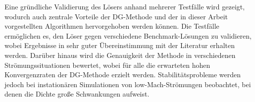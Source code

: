 Eine gründliche Validierung des Lösers anhand mehrerer Testfälle wird gezeigt, wodurch auch zentrale Vorteile der DG-Methode und der in dieser Arbeit vorgestellten Algorithmen hervorgehoben werden können. Die Testfälle ermöglichen es, den Löser gegen verschiedene Benchmark-Lösungen zu validieren, wobei Ergebnisse in sehr guter Übereinstimmung mit der Literatur erhalten werden. Darüber hinaus wird die Genauigkeit der Methode in verschiedenen Strömungssituationen bewertet, wobei für alle die erwarteten hohen Konvergenzraten der \Gls{DG}-Methode erzielt werden.  Stabilitätsprobleme werden jedoch bei instationären Simulationen von low-Mach-Strömungen beobachtet, bei denen die Dichte große Schwankungen aufweist.
